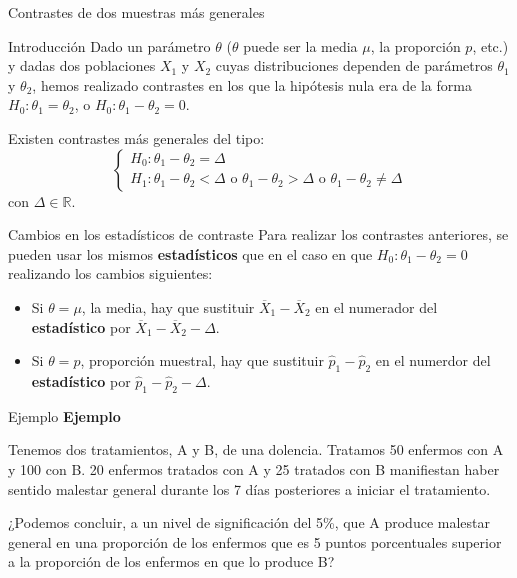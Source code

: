 \documentclass[
  ignorenonframetext,
]{beamer}
\begin{document}
\begin{frame}{Contrastes de dos muestras más generales}
\protect\hypertarget{contrastes-de-dos-muestras-muxe1s-generales}{}
\end{frame}

\begin{frame}{Introducción}
\protect\hypertarget{introducciuxf3n}{}
Dado un parámetro \(\theta\) (\(\theta\) puede ser la media \(\mu\), la
proporción \(p\), etc.) y dadas dos poblaciones \(X_1\) y \(X_2\) cuyas
distribuciones dependen de parámetros \(\theta_1\) y \(\theta_2\), hemos
realizado contrastes en los que la hipótesis nula era de la forma
\(H_0:\theta_1 = \theta_2\), o \(H_0:\theta_1 - \theta_2=0\).

Existen contrastes más generales del tipo: \[
\left\{\begin{array}{l}
H_0:\theta_1-\theta_2=\Delta\\
H_1:\theta_1-\theta_2<\Delta\mbox{ o }\theta_1-\theta_2>\Delta\mbox{ o }\theta_1-\theta_2\neq\Delta
\end{array}\right.
\] con \(\Delta\in \mathbb{R}\).
\end{frame}

\begin{frame}{Cambios en los estadísticos de contraste}
\protect\hypertarget{cambios-en-los-estaduxedsticos-de-contraste}{}
Para realizar los contrastes anteriores, se pueden usar los mismos
\textbf{estadísticos} que en el caso en que
\(H_0:\theta_1 - \theta_2=0\) realizando los cambios siguientes:

\begin{itemize}
\item
  Si \(\theta =\mu\), la media, hay que sustituir
  \(\overline{X}_1-\overline{X}_2\) en el numerador del
  \textbf{estadístico} por \(\overline{X}_1-\overline{X}_2-\Delta\).
\item
  Si \(\theta =p\), proporción muestral, hay que sustituir
  \(\widehat{p}_1-\widehat{p}_2\) en el numerdor del
  \textbf{estadístico} por \(\widehat{p}_1-\widehat{p}_2-\Delta\).
\end{itemize}
\end{frame}

\begin{frame}{Ejemplo}
\protect\hypertarget{ejemplo-15}{}
\textbf{Ejemplo}

Tenemos dos tratamientos, A y B, de una dolencia. Tratamos 50 enfermos
con A y 100 con B. 20 enfermos tratados con A y 25 tratados con B
manifiestan haber sentido malestar general durante los 7 días
posteriores a iniciar el tratamiento.

¿Podemos concluir, a un nivel de significación del 5\%, que A produce
malestar general en una proporción de los enfermos que es 5 puntos
porcentuales superior a la proporción de los enfermos en que lo produce
B?
\end{frame}
\end{document}
